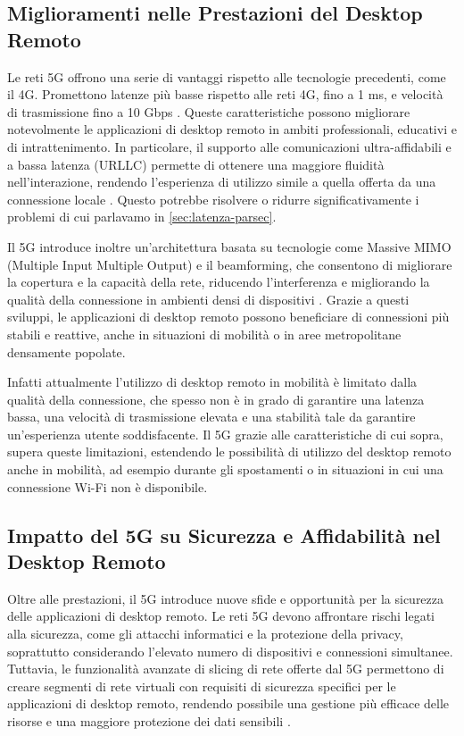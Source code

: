 \documentclass[12pt,a4paper,openright,twoside]{book}
\begin{document}
\subsection{Miglioramenti nelle Prestazioni del Desktop Remoto}

Le reti 5G offrono una serie di vantaggi rispetto alle tecnologie precedenti, come il 4G. Promettono latenze più basse rispetto alle reti 4G, fino a 1 ms, e velocità di trasmissione fino a 10 Gbps \cite{Dangi2021}. 
Queste caratteristiche possono migliorare notevolmente le applicazioni di desktop remoto in ambiti professionali, educativi e di intrattenimento. In particolare, il supporto alle comunicazioni ultra-affidabili e a bassa latenza (URLLC) permette di ottenere una maggiore fluidità nell’interazione, rendendo l’esperienza di utilizzo simile a quella offerta da una connessione locale \cite{Dangi2021, Sahu2024}. Questo potrebbe risolvere o ridurre significativamente i problemi di cui parlavamo in \ref{sec:latenza-parsec}.

Il 5G introduce inoltre un'architettura basata su tecnologie come Massive MIMO (Multiple Input Multiple Output) e il beamforming, che consentono di migliorare la copertura e la capacità della rete, riducendo l'interferenza e migliorando la qualità della connessione in ambienti densi di dispositivi \cite{Dangi2021}. Grazie a questi sviluppi, le applicazioni di desktop remoto possono beneficiare di connessioni più stabili e reattive, anche in situazioni di mobilità o in aree metropolitane densamente popolate.

Infatti attualmente l'utilizzo di desktop remoto in mobilità è limitato dalla qualità della connessione, che spesso non è in grado di garantire una latenza bassa, una velocità di trasmissione elevata e una stabilità tale da garantire un'esperienza utente soddisfacente. Il 5G grazie alle caratteristiche di cui sopra, supera queste limitazioni, estendendo le possibilità di utilizzo del desktop remoto anche in mobilità, ad esempio durante gli spostamenti o in situazioni in cui una connessione Wi-Fi non è disponibile.

\subsection{Impatto del 5G su Sicurezza e Affidabilità nel Desktop Remoto}

Oltre alle prestazioni, il 5G introduce nuove sfide e opportunità per la sicurezza delle applicazioni di desktop remoto. Le reti 5G devono affrontare rischi legati alla sicurezza, come gli attacchi informatici e la protezione della privacy, soprattutto considerando l’elevato numero di dispositivi e connessioni simultanee. Tuttavia, le funzionalità avanzate di slicing di rete offerte dal 5G permettono di creare segmenti di rete virtuali con requisiti di sicurezza specifici per le applicazioni di desktop remoto, rendendo possibile una gestione più efficace delle risorse e una maggiore protezione dei dati sensibili \cite{Dangi2021}.
\end{document}
